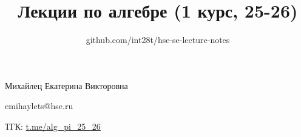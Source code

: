 \documentclass[a4paper,12pt]{article}
\title{Лекции по алгебре (1 курс, 25-26)}
\author{github.com/int28t/hse-se-lecture-notes}
\date{}
\begin{document}
    \pagestyle{empty}
	\maketitle
	\begin{flushright}
		Михайлец Екатерина Викторовна

		emihaylets@hse.ru

		ТГК: \url{t.me/alg_pi_25_26}
	\end{flushright}
	\tableofcontents{}
    \newpage
    \pagestyle{plain}
	
	
	
	
	

	

	
	
	
	
	
\end{document}
